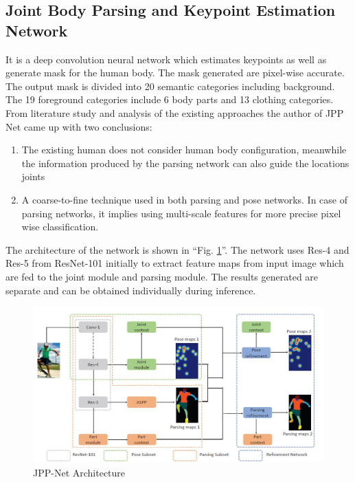 \documentclass[conference]{IEEEtran}
\begin{document}
\subsection{Joint Body Parsing and Keypoint Estimation Network} \label{jpp}
It is a deep convolution neural network which estimates keypoints as well as generate mask for the human body. The mask generated are pixel-wise accurate. The output mask is divided into 20 semantic categories including background. The 19 foreground categories include 6 body parts and 13 clothing categories. From literature study and analysis of the existing approaches the author of JPP Net came up with two conclusions:
\begin{enumerate}
  \item The existing human does not consider human body configuration, meanwhile the information produced by the parsing network can also guide the locations joints
   \item A coarse-to-fine technique used in both parsing and pose networks. In case of parsing networks, it implies using multi-scale features for more precise pixel wise classification.
\end{enumerate} 

The architecture of the network is shown in ``Fig. \ref{fig:JPP_arch}''. The network uses Res-4 and Res-5 from ResNet-101 initially to extract feature maps from input image which are fed to the joint module and parsing module. The results generated are separate and can be obtained individually during inference.
\begin{figure}[htbp]
\centerline{\includegraphics[width=\linewidth]{jpp_net}}
\caption{JPP-Net Architecture}
\label{fig:JPP_arch}
\end{figure} 
\end{document}
